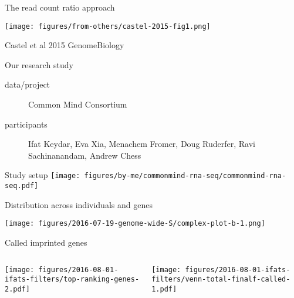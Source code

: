 \documentclass{beamer}
\begin{document}
\begin{frame}{The read count ratio approach}

\texttt{[image: figures/from-others/castel-2015-fig1.png]}

{\tiny Castel et al 2015 GenomeBiology}
\end{frame}

\begin{frame}[label=our-study]{Our research study}
\begin{description}
\item[data/project] Common Mind Consortium
\item[participants] \alert{Ifat Keydar}, Eva Xia, Menachem Fromer, Doug Ruderfer, Ravi Sachinanandam, Andrew Chess
\end{description}
\end{frame}

\begin{frame}[label=cmc]{Study setup}
\texttt{[image: figures/by-me/commonmind-rna-seq/commonmind-rna-seq.pdf]}
\end{frame}

\begin{frame}[t]{Distribution across individuals and genes}
\begin{center}
\texttt{[image: figures/2016-07-19-genome-wide-S/complex-plot-b-1.png]}
\end{center}
\end{frame}

\begin{frame}[label=filtering-calling]{Called imprinted genes}
\begin{columns}[t]
\begin{column}{0.4\textwidth}

\texttt{[image: figures/2016-08-01-ifats-filters/top-ranking-genes-2.pdf]}
\end{column}

\begin{column}{0.6\textwidth}

\texttt{[image: figures/2016-08-01-ifats-filters/venn-total-finalf-called-1.pdf]}
\end{column}
\end{columns}
\end{frame}
\end{document}
